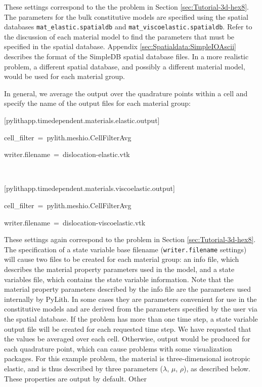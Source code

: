 These settings correspond to the the problem in Section \ref{sec:Tutorial-3d-hex8}.
The parameters for the bulk constitutive models are specified using
the spatial databases \texttt{mat\_elastic.spatialdb} and \texttt{mat\_viscoelastic.spatialdb}.
Refer to the discussion of each material model to find the parameters
that must be specified in the spatial database. Appendix \ref{sec:Spatialdata:SimpleIOAscii}
describes the format of the SimpleDB spatial database files. In a
more realistic problem, a different spatial database, and possibly
a different material model, would be used for each material group.

In general, we average the output over the quadrature points within
a cell and specify the name of the output files for each material
group:
\begin{lyxcode}
{[}pylithapp.timedependent.materials.elastic.output{]}

cell\_filter~=~pylith.meshio.CellFilterAvg

writer.filename~=~dislocation-elastic.vtk

~

{[}pylithapp.timedependent.materials.viscoelastic.output{]}

cell\_filter~=~pylith.meshio.CellFilterAvg

writer.filename~=~dislocation-viscoelastic.vtk
\end{lyxcode}
These settings again correspond to the problem in Section \ref{sec:Tutorial-3d-hex8}.
The specification of a state variable base filename (\texttt{writer.filename}
settings) will cause two files to be created for each material group:
an info file, which describes the material property parameters used
in the model, and a state variables file, which contains the state
variable information. Note that the material property parameters described
by the info file are the parameters used internally by PyLith. In
some cases they are parameters convenient for use in the constitutive
models and are derived from the parameters specified by the user via
the spatial database. If the problem has more than one time step,
a state variable output file will be created for each requested time
step. We have requested that the values be averaged over each cell.
Otherwise, output would be produced for each quadrature point, which
can cause problems with some visualization packages. For this example
problem, the material is three-dimensional isotropic elastic, and
is thus described by three parameters ($\lambda$, $\mu$, $\rho$),
as described below. These properties are output by default. Other
